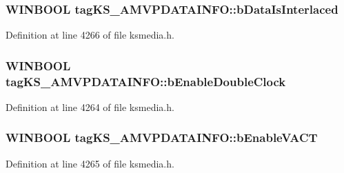 \subsubsection[{\texorpdfstring{b\+Data\+Is\+Interlaced}{bDataIsInterlaced}}]{\setlength{\rightskip}{0pt plus 5cm}W\+I\+N\+B\+O\+OL tag\+K\+S\+\_\+\+A\+M\+V\+P\+D\+A\+T\+A\+I\+N\+F\+O\+::b\+Data\+Is\+Interlaced}\hypertarget{structtag_k_s___a_m_v_p_d_a_t_a_i_n_f_o_ab5968a0c879a0293eb03d9de3c24ff73}{}\label{structtag_k_s___a_m_v_p_d_a_t_a_i_n_f_o_ab5968a0c879a0293eb03d9de3c24ff73}


Definition at line 4266 of file ksmedia.\+h.

\subsubsection[{\texorpdfstring{b\+Enable\+Double\+Clock}{bEnableDoubleClock}}]{\setlength{\rightskip}{0pt plus 5cm}W\+I\+N\+B\+O\+OL tag\+K\+S\+\_\+\+A\+M\+V\+P\+D\+A\+T\+A\+I\+N\+F\+O\+::b\+Enable\+Double\+Clock}\hypertarget{structtag_k_s___a_m_v_p_d_a_t_a_i_n_f_o_ac5243cc840bdf1976fbb7c57a9624d51}{}\label{structtag_k_s___a_m_v_p_d_a_t_a_i_n_f_o_ac5243cc840bdf1976fbb7c57a9624d51}


Definition at line 4264 of file ksmedia.\+h.

\subsubsection[{\texorpdfstring{b\+Enable\+V\+A\+CT}{bEnableVACT}}]{\setlength{\rightskip}{0pt plus 5cm}W\+I\+N\+B\+O\+OL tag\+K\+S\+\_\+\+A\+M\+V\+P\+D\+A\+T\+A\+I\+N\+F\+O\+::b\+Enable\+V\+A\+CT}\hypertarget{structtag_k_s___a_m_v_p_d_a_t_a_i_n_f_o_a6f33fbcc7e324444f6dbb54d7dea8ef5}{}\label{structtag_k_s___a_m_v_p_d_a_t_a_i_n_f_o_a6f33fbcc7e324444f6dbb54d7dea8ef5}


Definition at line 4265 of file ksmedia.\+h.

